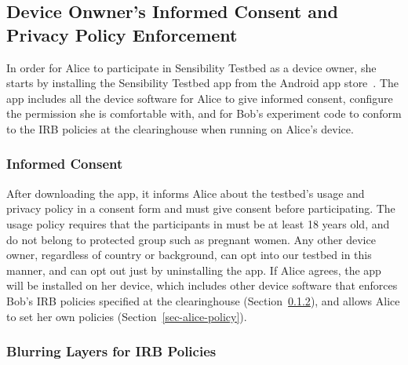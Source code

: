 
\subsection{Device Onwner's Informed Consent and Privacy Policy 
Enforcement}\label{sec-repy}

In order for Alice to participate in Sensibility Testbed as a device owner,
she starts by installing the Sensibility Testbed app from 
the Android app store~\cite{sensibility-app}. The app includes all the device
software for Alice to give informed consent, configure the permission she
is comfortable with, and for Bob's experiment code to conform to the 
IRB policies at the clearinghouse when running on Alice's device.

\subsubsection{Informed Consent}

After downloading the app, it informs Alice about the testbed's usage and 
privacy policy in a consent form and must give consent before participating.
The usage policy requires that the participants in \sysname must be at least 
18 years old, and do not belong to protected group such as pregnant women.
Any other device owner, regardless of country or background, can 
opt into our testbed in this manner, and can opt out just by uninstalling the app. 
If Alice agrees, the app will be installed on her device, which includes other
device software that enforces Bob's IRB policies specified at the 
clearinghouse (Section~\ref{sec-bob-policy}), and allows Alice to set her 
own policies (Section~\ref{sec-alice-policy}).


\subsubsection{Blurring Layers for IRB Policies}\label{sec-bob-policy}

